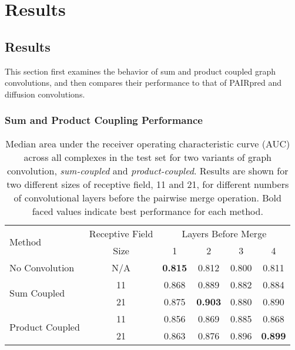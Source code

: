 \chapter{Results}
\label{chap:results}



\section{Results}

This section first examines the behavior of sum and product coupled graph convolutions, and then compares their performance to that of PAIRpred and diffusion convolutions.

\subsection{Sum and Product Coupling Performance}

\begin{table}
	\begin{center}
		\begin{tabular}{lccccc}
			\toprule
			\multirow{2}{*}{Method} &
			Receptive Field & \multicolumn{4}{c}{Layers Before Merge} \\
			& Size & 1 & {2} & {3} & {4} \\
			\midrule
			No Convolution & N/A & \textbf{0.815} & 0.812 & 0.800 & 0.811  \\\cline{1-6}
			\multirow{2}{*}{Sum Coupled} & 11 & 0.868 & 0.889 & 0.882 & 0.884 \\
			& 21 & 0.875 & \textbf{0.903} & 0.880 & 0.890 \\\cline{1-6}
			\multirow{2}{*}{Product Coupled} & 11 & 0.856 & 0.869 & 0.885 & 0.868 \\
			& 21 & 0.863 & 0.876 & 0.896 & \textbf{0.899} \\
			\bottomrule
		\end{tabular}
		\caption{Median area under the receiver operating characteristic curve (AUC) across all complexes in the test set for two variants of graph convolution, \textit{sum-coupled} and \textit{product-coupled}. Results are shown for two different sizes of receptive field, 11 and 21, for different numbers of convolutional layers before the pairwise merge operation. Bold faced values indicate best performance for each method.}
		\label{tab:med_auc}
	\end{center}
\end{table}

